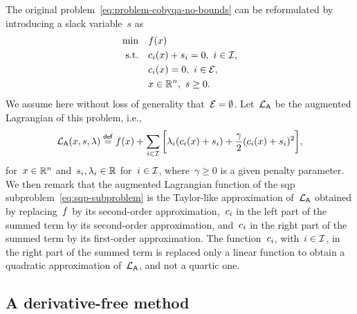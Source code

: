 The original problem~\cref{eq:problem-cobyqa-no-bounds} can be reformulated by introducing a slack variable~$s$ as
\begin{align}
    \min        & \quad f(x)\\
    \text{s.t.} & \quad c_{i}(x) + s_i = 0, ~ i \in \mathcal{I},\\
                & \quad c_{i}(x) = 0, ~ i \in \mathcal{E},\\
                & \quad x \in \mathbb{R}^n, ~ s \ge 0.
\end{align}
We assume here without loss of generality that~$\mathcal{E} = \emptyset$.
Let~$\lag[\mathsf{A}]$ be the augmented Lagrangian of this problem, i.e.,
\begin{equation*}
    \lag[\mathsf{A}](x, s, \lambda) \eqdef \obj(x) + \sum_{i \in \iub} \bigg[ \lambda_i (\con{i}(x) + s_i) + \frac{\gamma}{2} (\con{i}(x) + s_i)^2 \bigg],
\end{equation*}
for~$x \in \mathbb{R}^n$ and~$s_i, \lambda_i \in \mathbb{R}$ for~$i \in \mathcal{I}$, where~$\gamma \ge 0$ is a given penalty parameter.
We then remark that the augmented Lagrangian function of the \gls{sqp} subproblem~\cref{eq:sqp-subproblem} is the Taylor-like approximation of~$\lag[\textsf{A}]$ obtained by replacing~$f$ by its second-order approximation,~$c_{i}$ in the left part of the summed term by its second-order approximation, and~$c_{i}$ in the right part of the summed term by its first-order approximation. The function~$c_{i}$, with~$i \in \mathcal{I}$, in the right part of the summed term is replaced only a linear function to obtain a quadratic approximation of~$\lag[\mathsf{A}]$, and not a quartic one.

\subsection{A derivative-free  method}

